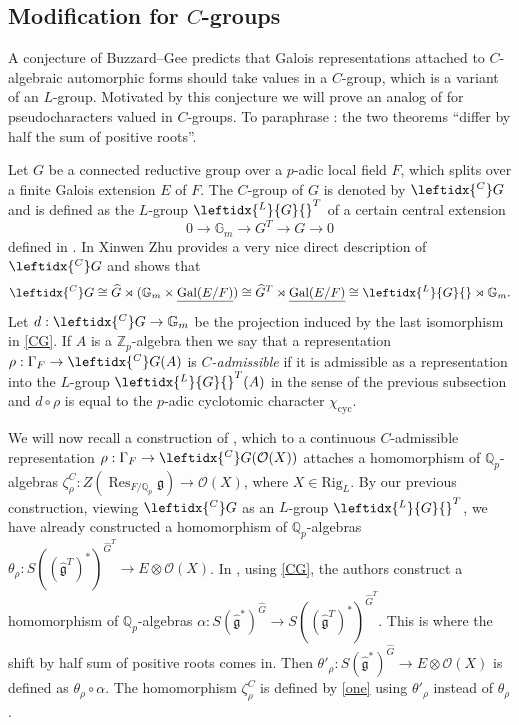 \documentclass{amsart}
\theoremstyle{definition}
\theoremstyle{remark}
\DeclareMathOperator{\Res}{Res}
\DeclareMathOperator{\Gal}{Gal}
\newcommand{\Qp}{\mathbb {Q}_p}
\newcommand{\Zp}{\ZZ_p}
\newcommand{\ZZ}{\mathbb Z}
\newcommand{\OO}{\mathcal O}
\newcommand{\Gm}{\mathbb G_m}
\newcommand{\cyc}{\mathrm{cyc}}
\newcommand{\Ghat}{\widehat{G}}
\newcommand{\LG}{\leftidx{^L}{G}{}}
\newcommand{\CG}{\leftidx{^C}G{}}
\newcommand{\ghat}{\widehat{\mathfrak g}}
\newcommand{\Rig}{\mathrm{Rig}}
\begin{document}
\subsection{\texorpdfstring{Modification for $C$-groups}{Modification for C-groups}}\label{sec_mod_C}
A conjecture of Buzzard--Gee \cite[Conjecture 5.3.4]{BG} predicts that Galois representations
attached to $C$-algebraic automorphic forms should take values in a $C$-group, which is a variant of an $L$-group. Motivated by this 
conjecture we will prove an analog of  for pseudocharacters 
valued in $C$-groups. To paraphrase \cite{BG}: the two theorems
``differ by half the sum of positive roots''.

Let $G$ be a connected reductive group over 
a $p$-adic local field $F$, which splits over 
a finite Galois extension $E$ of $F$. The $C$-group of $G$ is denoted by $\CG$ and is defined as the $L$-group $\LG^T$ of a certain central extension 
\begin{equation} 
0 \rightarrow \Gm \rightarrow G^T \rightarrow G \rightarrow 0
\end{equation}
defined in \cite[Proposition 5.3.1]{BG}. In 
\cite[Section 1]{zhu} Xinwen Zhu provides a very nice direct description of $\CG$ and shows that 
\begin{equation}\label{CG}
\CG\cong \Ghat \rtimes ( \Gm \times \underline{\Gal(E/F)}) 
\cong  \Ghat^T \rtimes \underline{\Gal(E/F)}\cong \LG \rtimes \Gm. 
\end{equation}
Let $d:\CG \rightarrow \Gm$ be the projection induced by the last isomorphism in \eqref{CG}. If $A$ is a $\Zp$-algebra then we say that a representation $\rho: \Gamma_F \rightarrow \CG(A)$ is \textit{$C$-admissible} if it is admissible as 
a representation into the $L$-group $\LG^T(A)$ in the sense of the previous subsection and 
$d\circ \rho$ is equal to the $p$-adic cyclotomic character $\chi_{\cyc}$.



We will now recall a construction of \cite[Section 4.7]{DPS}, which to a continuous  $C$-admissible representation $\rho: \Gamma_F \rightarrow \CG(\OO(X))$ attaches 
a homomorphism of $\Qp$-algebras 
$\zeta^C_\rho: Z(\Res_{F/\Qp}\mathfrak g)\rightarrow \OO(X)$, where $X\in \Rig_L$. By our previous 
construction, viewing $\CG$ as 
an $L$-group $\LG^T$, we have 
already constructed a homomorphism of $\Qp$-algebras $\theta_{\rho}: S((\ghat^T)^*)^{\Ghat^T} \rightarrow E\otimes \OO(X)$. In \cite[Section 4.7]{DPS}, using \eqref{CG}, the authors construct a homomorphism of  $\Qp$-algebras 
$\alpha: S(\ghat^*)^{\Ghat}\rightarrow S((\ghat^T)^*)^{\Ghat^T}$. This is where the shift by half sum of positive roots comes in. Then 
$\theta'_{\rho}: S(\ghat^*)^{\Ghat}\rightarrow E\otimes\OO(X)$ is defined as $\theta_{\rho}\circ \alpha$.
The homomorphism $\zeta^C_{\rho}$ is defined by \eqref{one} using $\theta'_{\rho}$ instead of $\theta_{\rho}$.
\end{document}

